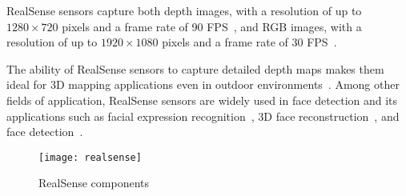 RealSense sensors capture both depth images,
with a resolution of up to $1280 \times 720$ pixels and a frame rate of 90 FPS~\cite{realsense-resolution},
and RGB images, with a resolution of up to $1920 \times 1080$ pixels and a frame rate of 30 FPS~\cite{realsense-resolution}.

The ability of RealSense sensors to capture detailed depth maps makes them
ideal for 3D mapping applications even in outdoor environments~\cite{realsense-mapping}.
Among other fields of application, RealSense sensors are widely used in face detection
and its applications such as facial expression recognition~\cite{realsense-expressions},
3D face reconstruction~\cite{realsense-face-reconstruction},
and face detection~\cite{realsense-face-detection}.

\begin{figure}[ht]
	\texttt{[image: realsense]}
	\caption{RealSense components}
	\label{fig:realsense-components}
\end{figure}



